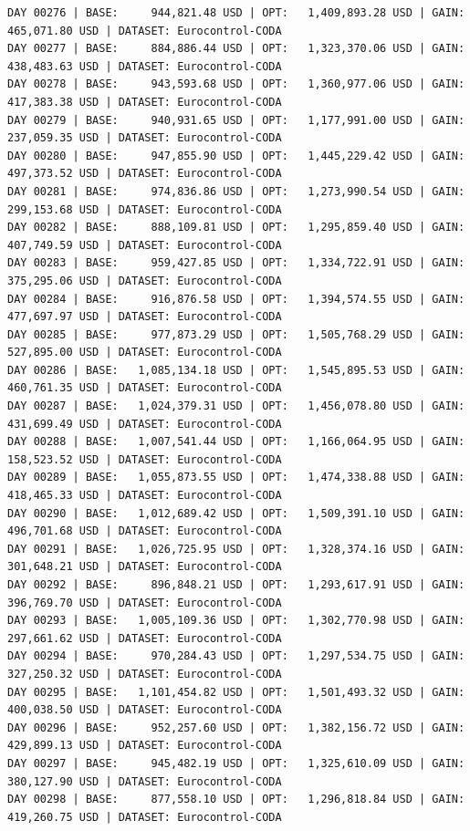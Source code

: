 \documentclass[11pt,a4paper]{article}
\begin{document}
\begin{verbatim}
DAY 00276 | BASE:     944,821.48 USD | OPT:   1,409,893.28 USD | GAIN: 465,071.80 USD | DATASET: Eurocontrol-CODA
DAY 00277 | BASE:     884,886.44 USD | OPT:   1,323,370.06 USD | GAIN: 438,483.63 USD | DATASET: Eurocontrol-CODA
DAY 00278 | BASE:     943,593.68 USD | OPT:   1,360,977.06 USD | GAIN: 417,383.38 USD | DATASET: Eurocontrol-CODA
DAY 00279 | BASE:     940,931.65 USD | OPT:   1,177,991.00 USD | GAIN: 237,059.35 USD | DATASET: Eurocontrol-CODA
DAY 00280 | BASE:     947,855.90 USD | OPT:   1,445,229.42 USD | GAIN: 497,373.52 USD | DATASET: Eurocontrol-CODA
DAY 00281 | BASE:     974,836.86 USD | OPT:   1,273,990.54 USD | GAIN: 299,153.68 USD | DATASET: Eurocontrol-CODA
DAY 00282 | BASE:     888,109.81 USD | OPT:   1,295,859.40 USD | GAIN: 407,749.59 USD | DATASET: Eurocontrol-CODA
DAY 00283 | BASE:     959,427.85 USD | OPT:   1,334,722.91 USD | GAIN: 375,295.06 USD | DATASET: Eurocontrol-CODA
DAY 00284 | BASE:     916,876.58 USD | OPT:   1,394,574.55 USD | GAIN: 477,697.97 USD | DATASET: Eurocontrol-CODA
DAY 00285 | BASE:     977,873.29 USD | OPT:   1,505,768.29 USD | GAIN: 527,895.00 USD | DATASET: Eurocontrol-CODA
DAY 00286 | BASE:   1,085,134.18 USD | OPT:   1,545,895.53 USD | GAIN: 460,761.35 USD | DATASET: Eurocontrol-CODA
DAY 00287 | BASE:   1,024,379.31 USD | OPT:   1,456,078.80 USD | GAIN: 431,699.49 USD | DATASET: Eurocontrol-CODA
DAY 00288 | BASE:   1,007,541.44 USD | OPT:   1,166,064.95 USD | GAIN: 158,523.52 USD | DATASET: Eurocontrol-CODA
DAY 00289 | BASE:   1,055,873.55 USD | OPT:   1,474,338.88 USD | GAIN: 418,465.33 USD | DATASET: Eurocontrol-CODA
DAY 00290 | BASE:   1,012,689.42 USD | OPT:   1,509,391.10 USD | GAIN: 496,701.68 USD | DATASET: Eurocontrol-CODA
DAY 00291 | BASE:   1,026,725.95 USD | OPT:   1,328,374.16 USD | GAIN: 301,648.21 USD | DATASET: Eurocontrol-CODA
DAY 00292 | BASE:     896,848.21 USD | OPT:   1,293,617.91 USD | GAIN: 396,769.70 USD | DATASET: Eurocontrol-CODA
DAY 00293 | BASE:   1,005,109.36 USD | OPT:   1,302,770.98 USD | GAIN: 297,661.62 USD | DATASET: Eurocontrol-CODA
DAY 00294 | BASE:     970,284.43 USD | OPT:   1,297,534.75 USD | GAIN: 327,250.32 USD | DATASET: Eurocontrol-CODA
DAY 00295 | BASE:   1,101,454.82 USD | OPT:   1,501,493.32 USD | GAIN: 400,038.50 USD | DATASET: Eurocontrol-CODA
DAY 00296 | BASE:     952,257.60 USD | OPT:   1,382,156.72 USD | GAIN: 429,899.13 USD | DATASET: Eurocontrol-CODA
DAY 00297 | BASE:     945,482.19 USD | OPT:   1,325,610.09 USD | GAIN: 380,127.90 USD | DATASET: Eurocontrol-CODA
DAY 00298 | BASE:     877,558.10 USD | OPT:   1,296,818.84 USD | GAIN: 419,260.75 USD | DATASET: Eurocontrol-CODA

\end{verbatim}
\end{document}
